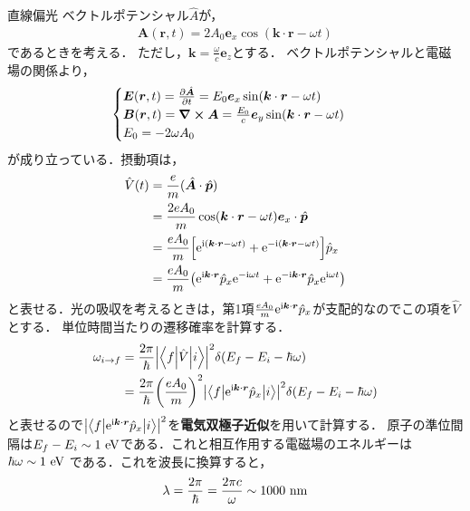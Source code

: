 \documentclass{report}
\begin{document}
  \begin{myex}{直線偏光}{}
    ベクトルポテンシャル$\hat{A}$が，
    \begin{align}
      \bm{A}(\bm{r},t) = 2A_0 \bm{e}_x \cos(\bm{k} \cdot \bm{r} - \omega t)
    \end{align}
    であるときを考える．
    ただし，$\bm{k} = \frac{\omega}{c}\bm{e}_z$とする．
    ベクトルポテンシャルと電磁場の関係より，
    \begin{align}
      \begin{cases}
      \bm{E}(\bm{r}, t) = \pdv{\hat{\bm{A}}}{t} = E_0 \bm{e}_x \sin(\bm{k} \cdot \bm{r} - \omega t)\\
      \bm{B}(\bm{r}, t) = \curl\bm{A} = \frac{E_0}{c}\bm{e}_y \sin(\bm{k} \cdot \bm{r} - \omega t)\\
      E_0 = -2 \omega A_0
      \end{cases}
    \end{align}
    が成り立っている．摂動項は，
    \begin{align}
      \hat{V}(t) &= \frac{e}{m}(\hat{\bm{A}}\cdot\hat{\bm{p}}) \\
      &= \frac{2eA_0}{m}\cos(\bm{k} \cdot \bm{r} - \omega t)\bm{e}_x\cdot\hat{\bm{p}} \\
      &= \frac{eA_0}{m}\qty[\mathrm{e}^{\mathrm{i}(\bm{k}\cdot\bm{r} - \omega t)} + \mathrm{e}^{-\mathrm{i}(\bm{k}\cdot\bm{r} - \omega t)}]\hat{p}_x\\
      &= \frac{eA_0}{m}\qty(\mathrm{e}^{\mathrm{i}\bm{k}\cdot\bm{r}}\hat{p}_x\mathrm{e}^{-\mathrm{i}\omega t} + \mathrm{e}^{-\mathrm{i} \bm{k}\cdot\bm{r}}\hat{p}_x \mathrm{e}^{\mathrm{i} \omega t})
    \end{align}
    と表せる．光の吸収を考えるときは，第1項$\frac{eA_0}{m}\mathrm{e}^{\mathrm{i}\bm{k}\cdot\bm{r}}\hat{p}_x$が支配的なのでこの項を$\hat{V}$とする．
    単位時間当たりの遷移確率を計算する．
    \begin{align}
      \omega_{i\to f} &= \frac{2\pi}{\hbar} \abs{\mel**{f}{\hat{V}}{i}}^2\delta(E_f - E_i - \hbar \omega) \\
      &= \frac{2 \pi}{\hbar}\qty(\frac{e A_0}{m})^2 \abs{\mel**{f}{\mathrm{e}^{\mathrm{i}\bm{k}\cdot \bm{r}}\hat{p}_x}{i}}^2 \delta(E_f - E_i - \hbar \omega)
    \end{align}
    と表せるので$\abs{\mel**{f}{\mathrm{e}^{\mathrm{i}\bm{k}\cdot\bm{r}}\hat{p}_x}{i}}^2$を\textbf{電気双極子近似}を用いて計算する．
    原子の準位間隔は$E_f - E_i \sim 1\ \r{eV}$である．これと相互作用する電磁場のエネルギーは$\hbar \omega\sim 1\ \mathrm{eV}$ である．これを波長に換算すると，
    \begin{align}
      \lambda = \frac{2\pi}{\hbar} = \frac{2\pi c}{\omega} \sim 1000\ \r{nm}

\end{align}
\end{myex}
\end{document}
